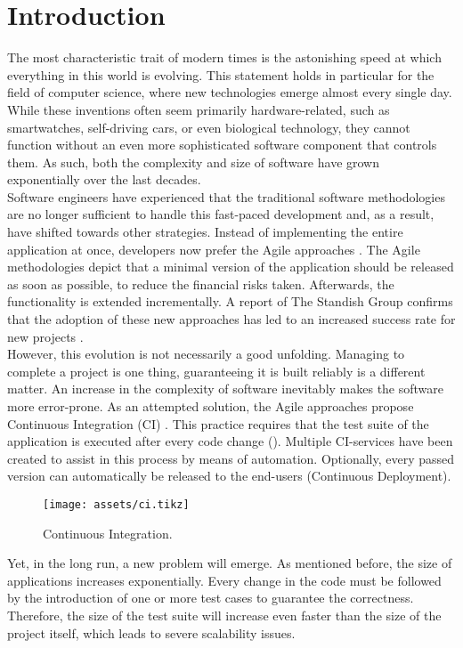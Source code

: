 
\section{Introduction}
\noindent The most characteristic trait of modern times is the astonishing speed at which everything in this world is evolving. This statement holds in particular for the field of computer science, where new technologies emerge almost every single day. While these inventions often seem primarily hardware-related, such as smartwatches, self-driving cars, or even biological technology, they cannot function without an even more sophisticated software component that controls them. As such, both the complexity and size of software have grown exponentially over the last decades.\\

\noindent Software engineers have experienced that the traditional software methodologies are no longer sufficient to handle this fast-paced development and, as a result, have shifted towards other strategies. Instead of implementing the entire application at once, developers now prefer the Agile approaches \cite{beck2001agile}. The Agile methodologies depict that a minimal version of the application should be released as soon as possible, to reduce the financial risks taken. Afterwards, the functionality is extended incrementally. A report of The Standish Group confirms that the adoption of these new approaches has led to an increased success rate for new projects \cite{standish2015chaos}.\\

\noindent However, this evolution is not necessarily a good unfolding. Managing to complete a project is one thing, guaranteeing it is built reliably is a different matter. An increase in the complexity of software inevitably makes the software more error-prone. As an attempted solution, the Agile approaches propose Continuous Integration (CI) \cite{SmartJenkinsDefinitive}. This practice requires that the test suite of the application is executed after every code change (). Multiple CI-services have been created to assist in this process by means of automation. Optionally, every passed version can automatically be released to the end-users (Continuous Deployment).

\begin{figure}[h!]
	\centering
	\texttt{[image: assets/ci.tikz]}
	\caption{Continuous Integration.}
	\label{fig:ext-en-ci}
\end{figure}

\noindent Yet, in the long run, a new problem will emerge. As mentioned before, the size of applications increases exponentially. Every change in the code must be followed by the introduction of one or more test cases to guarantee the correctness. Therefore, the size of the test suite will increase even faster than the size of the project itself, which leads to severe scalability issues.